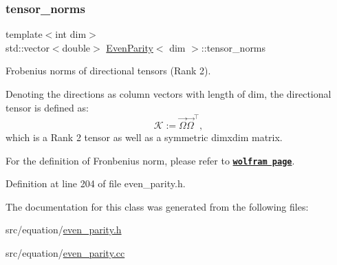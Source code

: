 \subsubsection{\texorpdfstring{tensor\+\_\+norms}{tensor\_norms}}
{\footnotesize\ttfamily template$<$int dim$>$ \\
std\+::vector$<$double$>$ \hyperlink{class_even_parity}{Even\+Parity}$<$ dim $>$\+::tensor\+\_\+norms\hspace{0.3cm}{\ttfamily [private]}}



Frobenius norms of directional tensors (Rank 2). 

Denoting the directions as column vectors with length of dim, the directional tensor is defined as\+: \[ \mathcal{K}:=\vec{\Omega}\vec{\Omega}^\top, \] which is a Rank 2 tensor as well as a symmetric dimxdim matrix.

For the definition of Fronbenius norm, please refer to \href{http://mathwo
rld.wolfram.com/FrobeniusNorm.html}{\tt {\bfseries wolfram page}}. 

Definition at line 204 of file even\+\_\+parity.\+h.



The documentation for this class was generated from the following files\+:\begin{DoxyCompactItemize}
\item 
src/equation/\hyperlink{even__parity_8h}{even\+\_\+parity.\+h}\item 
src/equation/\hyperlink{even__parity_8cc}{even\+\_\+parity.\+cc}\end{DoxyCompactItemize}
